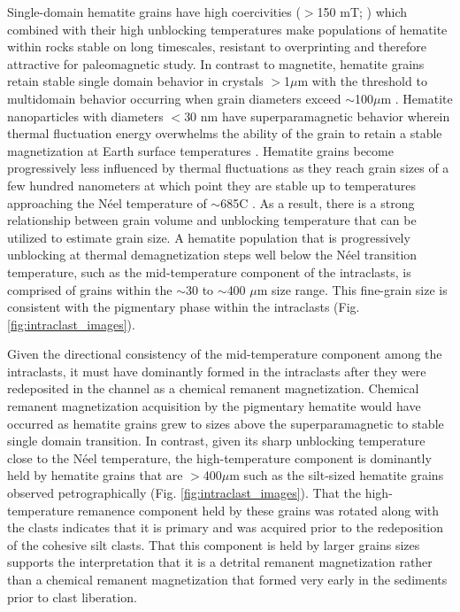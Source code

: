 \documentclass[11pt,letterpaper]{article}
\begin{document}
Single-domain hematite grains have high coercivities ($>$150 mT; \citealp{Ozdemir2014a}) which combined with their high unblocking temperatures make populations of hematite within rocks stable on long timescales, resistant to overprinting and therefore attractive for paleomagnetic study. In contrast to magnetite, hematite grains retain stable single domain behavior in crystals $>$1$\mu$m with the threshold to multidomain behavior occurring when grain diameters exceed $\sim$100$\mu$m \citep{Kletetschka2002a, Ozdemir2014a}. Hematite nanoparticles with diameters $<$30 nm have superparamagnetic behavior wherein thermal fluctuation energy overwhelms the ability of the grain to retain a stable magnetization at Earth surface temperatures \citep{Ozdemir2014a}. Hematite grains become progressively less influenced by thermal fluctuations as they reach grain sizes of a few hundred nanometers at which point they are stable up to temperatures approaching the N\'eel temperature of $\sim$685\textdegree C \citep{Swanson-Hysell2011a, Ozdemir2014a}. As a result, there is a strong relationship between grain volume and unblocking temperature that can be utilized to estimate grain size. A hematite population that is progressively unblocking at thermal demagnetization steps well below the N\'eel transition temperature, such as the mid-temperature component of the intraclasts, is comprised of grains within the $\sim$30 to $\sim$400 $\mu$m size range. This fine-grain size is consistent with the pigmentary phase within the intraclasts (Fig. \ref{fig:intraclast_images}). 

Given the directional consistency of the mid-temperature component among the intraclasts, it must have dominantly formed in the intraclasts after they were redeposited in the channel as a chemical remanent magnetization. Chemical remanent magnetization acquisition by the pigmentary hematite would have occurred as hematite grains grew to sizes above the superparamagnetic to stable single domain transition. In contrast, given its sharp unblocking temperature close to the N\'eel temperature, the high-temperature component is dominantly held by hematite grains that are $>$400$\mu$m such as the silt-sized hematite grains observed petrographically (Fig. \ref{fig:intraclast_images}). That the high-temperature remanence component held by these grains was rotated along with the clasts indicates that it is primary and was acquired prior to the redeposition of the cohesive silt clasts. That this component is held by larger grains sizes supports the interpretation that it is a detrital remanent magnetization rather than a chemical remanent magnetization that formed very early in the sediments prior to clast liberation.
\end{document}
